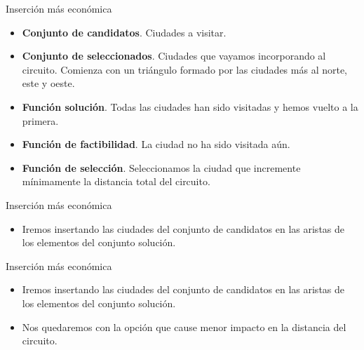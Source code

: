 \documentclass{beamer}
\begin{document}
\begin{frame}[fragile]{Inserción más económica}

\begin{itemize}
	\item \textbf{Conjunto de candidatos}. Ciudades a visitar.
	\item \textbf{Conjunto de seleccionados}. Ciudades que vayamos incorporando al circuito. Comienza con un triángulo formado por las ciudades más al norte, este y oeste.
	\item \textbf{Función solución}. Todas las ciudades han sido visitadas y hemos vuelto a la primera.
	\item \textbf{Función de factibilidad}. La ciudad no ha sido visitada aún.
	\item \textbf{Función de selección}. Seleccionamos la ciudad que incremente mínimamente la distancia total del circuito.
\end{itemize}

\end{frame}

\begin{frame}[fragile]{Inserción más económica}

\begin{itemize}
	\item Iremos insertando las ciudades del conjunto de candidatos en las aristas de los elementos del conjunto solución.
\end{itemize}

\end{frame}

\begin{frame}[fragile]{Inserción más económica}

\begin{itemize}
	\item Iremos insertando las ciudades del conjunto de candidatos en las aristas de los elementos del conjunto solución.
	\item Nos quedaremos con la opción que cause menor impacto en la distancia del circuito.
\end{itemize}

\end{frame}
\end{document}
